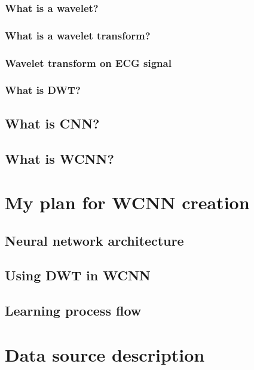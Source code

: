 \documentclass[12pt, a4paper, twoside]{scrartcl}
\begin{document}
\subsubsection{What is a wavelet?}

\subsubsection{What is a wavelet transform?}

\subsubsection{Wavelet transform on \ac{ECG} signal}

\subsubsection{What is \ac{DWT}?}

\subsection{What is \ac{CNN}?}

\subsection{What is \ac{WCNN}?}

\clearpage


\section{My plan for \ac{WCNN} creation}

\subsection{Neural network architecture}

\subsection{Using \ac{DWT} in \ac{WCNN}}

\subsection{Learning process flow}

\clearpage


\section{Data source description}
\end{document}
